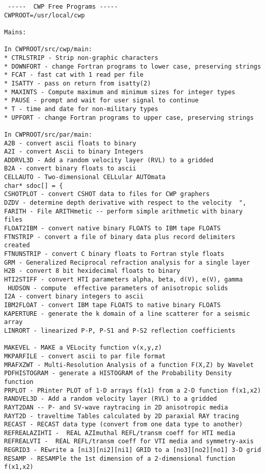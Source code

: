 {\small\begin{verbatim}
 -----  CWP Free Programs -----   
CWPROOT=/usr/local/cwp

Mains: 

In CWPROOT/src/cwp/main:
* CTRLSTRIP - Strip non-graphic characters
* DOWNFORT - change Fortran programs to lower case, preserving strings
* FCAT - fast cat with 1 read per file 
* ISATTY - pass on return from isatty(2)
* MAXINTS - Compute maximum and minimum sizes for integer types 
* PAUSE - prompt and wait for user signal to continue
* T - time and date for non-military types
* UPFORT - change Fortran programs to upper case, preserving strings

In CWPROOT/src/par/main:
A2B - convert ascii floats to binary 				
A2I - convert Ascii to binary Integers			
ADDRVL3D - Add a random velocity layer (RVL) to a gridded             
B2A - convert binary floats to ascii				
CELLAUTO - Two-dimensional CELLular AUTOmata			  	
char* sdoc[] = {
CSHOTPLOT - convert CSHOT data to files for CWP graphers		
DZDV - determine depth derivative with respect to the velocity	",  
FARITH - File ARITHmetic -- perform simple arithmetic with binary files
FLOAT2IBM - convert native binary FLOATS to IBM tape FLOATS	
FTNSTRIP - convert a file of binary data plus record delimiters created
FTNUNSTRIP - convert C binary floats to Fortran style floats	
GRM - Generalized Reciprocal refraction analysis for a single layer	
H2B - convert 8 bit hexidecimal floats to binary		
HTI2STIFF - convert HTI parameters alpha, beta, d(V), e(V), gamma	
 HUDSON - compute  effective parameters of anisotropic solids	        
I2A - convert binary integers to ascii				
IBM2FLOAT - convert IBM tape FLOATS to native binary FLOATS	
KAPERTURE - generate the k domain of a line scatterer for a seismic array
LINRORT - linearized P-P, P-S1 and P-S2 reflection coefficients 	

MAKEVEL - MAKE a VELocity function v(x,y,z)				
MKPARFILE - convert ascii to par file format 				
MRAFXZWT - Multi-Resolution Analysis of a function F(X,Z) by Wavelet	
PDFHISTOGRAM - generate a HISTOGRAM of the Probability Density function
PRPLOT - PRinter PLOT of 1-D arrays f(x1) from a 2-D function f(x1,x2)
RANDVEL3D - Add a random velocity layer (RVL) to a gridded             
RAYT2DAN -- P- and SV-wave raytracing in 2D anisotropic media		
RAYT2D - traveltime Tables calculated by 2D paraxial RAY tracing	
RECAST - RECAST data type (convert from one data type to another)	
REFREALAZIHTI -  REAL AZImuthal REFL/transm coeff for HTI media 	
REFREALVTI -  REAL REFL/transm coeff for VTI media and symmetry-axis	
REGRID3 - REwrite a [ni3][ni2][ni1] GRID to a [no3][no2][no1] 3-D grid
RESAMP - RESAMPle the 1st dimension of a 2-dimensional function f(x1,x2)


\end{verbatim}}

